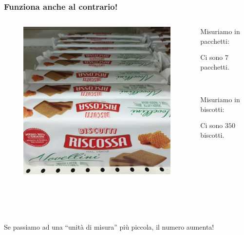 \documentclass[handout]{beamer}
\theoremstyle{plain}
\begin{document}
\begin{frame}
\frametitle{Funziona anche al contrario!}
\begin{columns}
  \begin{column}{0.5\textwidth}
  \begin{figure}
    \includegraphics[width=\columnwidth]{img/biscotti.png}
  \end{figure}    
  \end{column}
  \begin{column}{0.5\textwidth}
    Misuriamo in pacchetti:
    \begin{center}
      Ci sono \alert{$ 7 $} pacchetti.\pause  
    \end{center}
    
    ~

    Misuriamo in biscotti:
    \begin{center}
      Ci sono \alert{$ 350 $} biscotti.\pause  
    \end{center}
  \end{column}
\end{columns}

~


~

Se passiamo ad una ``unità di misura'' più piccola, \alert{il numero aumenta}!
\end{frame}
\end{document}
